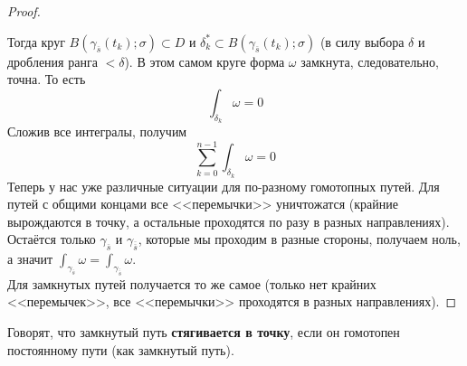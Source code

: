 \documentclass{article}
\begin{document}
\begin{proof}
\begin{figure}[H]
        \end{figure}\noindent
        Тогда круг $B(\gamma_{\overline s}(t_k);\sigma)\subset D$ и $\delta_k^*\subset B(\gamma_{\overline s}(t_k);\sigma)$ (в силу выбора $\delta$ и дробления ранга $<\delta$). В этом самом круге форма $\omega$ замкнута, следовательно, точна. То есть
        $$
        \int_{\delta_k}\omega=0
        $$
        Сложив все интегралы, получим
        $$
        \sum\limits_{k=0}^{n-1}\int_{\delta_k}\omega=0
        $$
        Теперь у нас уже различные ситуации для по-разному гомотопных путей. Для путей с общими концами все <<перемычки>> уничтожатся (крайние вырождаются в точку, а остальные проходятся по разу в разных направлениях). Остаётся только $\gamma_{\overline s}$ и $\gamma_{\overline{\overline s}}$, которые мы проходим в разные стороны, получаем ноль, а значит $\int_{\gamma_{\overline s}}\omega=\int_{\gamma_{\overline{\overline s}}}\omega$.\\
        Для замкнутых путей получается то же самое (только нет крайних <<перемычек>>, все <<перемычки>> проходятся в разных направлениях).
    \end{proof}
    \begin{definition}
        Говорят, что замкнутый путь \textbf{стягивается в точку}, если он гомотопен постоянному пути (как замкнутый путь).
    \end{definition}
\end{document}
